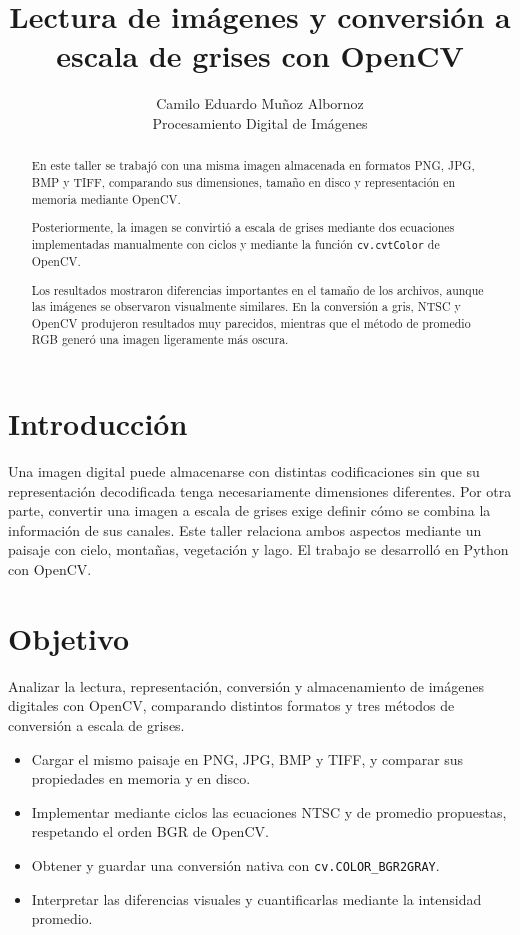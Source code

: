 \documentclass[11pt,a4paper]{article}
\title{Lectura de im\'agenes y conversi\'on a escala de grises con OpenCV}
\author{Camilo Eduardo Mu\~noz Albornoz\\
    Procesamiento Digital de Im\'agenes}
\date{}
\begin{document}
\maketitle
\begin{abstract}

En este taller se trabajó con una misma imagen almacenada en formatos PNG,
JPG, BMP y TIFF, comparando sus dimensiones, tamaño en disco y representación
en memoria mediante OpenCV.

Posteriormente, la imagen se convirtió a escala de grises mediante dos
ecuaciones implementadas manualmente con ciclos y mediante la función
\texttt{cv.cvtColor} de OpenCV.

Los resultados mostraron diferencias importantes en el tamaño de los archivos,
aunque las imágenes se observaron visualmente similares. En la conversión a
gris, NTSC y OpenCV produjeron resultados muy parecidos, mientras que el
método de promedio RGB generó una imagen ligeramente más oscura.

\end{abstract}

\section*{Introducci\'on}
Una imagen digital puede almacenarse con distintas codificaciones sin que
su representaci\'on decodificada tenga necesariamente dimensiones diferentes.
Por otra parte, convertir una imagen a escala de grises exige definir
c\'omo se combina la informaci\'on de sus canales. Este taller relaciona
ambos aspectos mediante un paisaje con cielo, monta\~nas, vegetaci\'on y lago.
El trabajo se desarroll\'o en Python con OpenCV.

\section{Objetivo}
Analizar la lectura, representaci\'on, conversi\'on y almacenamiento de
im\'agenes digitales con OpenCV, comparando distintos formatos y tres
m\'etodos de conversi\'on a escala de grises.
\begin{itemize}
  \item Cargar el mismo paisaje en PNG, JPG, BMP y TIFF, y comparar sus
  propiedades en memoria y en disco.
  \item Implementar mediante ciclos las ecuaciones NTSC y de promedio
  propuestas, respetando el orden BGR de OpenCV.
  \item Obtener y guardar una conversi\'on nativa con
  \texttt{cv.COLOR\_BGR2GRAY}.
  \item Interpretar las diferencias visuales y cuantificarlas mediante
  la intensidad promedio.
\end{itemize}
\end{document}
